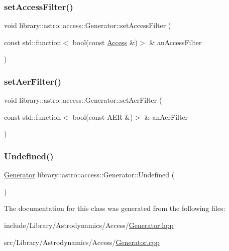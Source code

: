 \subsubsection{\texorpdfstring{set\+Access\+Filter()}{setAccessFilter()}}
{\footnotesize\ttfamily void library\+::astro\+::access\+::\+Generator\+::set\+Access\+Filter (\begin{DoxyParamCaption}\item[{const std\+::function$<$ bool(const \hyperlink{classlibrary_1_1astro_1_1_access}{Access} \&)$>$ \&}]{an\+Access\+Filter }\end{DoxyParamCaption})}

\mbox{\label{classlibrary_1_1astro_1_1access_1_1_generator_a2676ec52653573cf1ff91876f671a679}} 
\subsubsection{\texorpdfstring{set\+Aer\+Filter()}{setAerFilter()}}
{\footnotesize\ttfamily void library\+::astro\+::access\+::\+Generator\+::set\+Aer\+Filter (\begin{DoxyParamCaption}\item[{const std\+::function$<$ bool(const A\+ER \&)$>$ \&}]{an\+Aer\+Filter }\end{DoxyParamCaption})}

\mbox{\label{classlibrary_1_1astro_1_1access_1_1_generator_a772aae06882c9c24c93978ec246bcc83}} 
\subsubsection{\texorpdfstring{Undefined()}{Undefined()}}
{\footnotesize\ttfamily \hyperlink{classlibrary_1_1astro_1_1access_1_1_generator}{Generator} library\+::astro\+::access\+::\+Generator\+::\+Undefined (\begin{DoxyParamCaption}{ }\end{DoxyParamCaption})\hspace{0.3cm}{\ttfamily [static]}}



The documentation for this class was generated from the following files\+:\begin{DoxyCompactItemize}
\item 
include/\+Library/\+Astrodynamics/\+Access/\hyperlink{_generator_8hpp}{Generator.\+hpp}\item 
src/\+Library/\+Astrodynamics/\+Access/\hyperlink{_generator_8cpp}{Generator.\+cpp}\end{DoxyCompactItemize}
